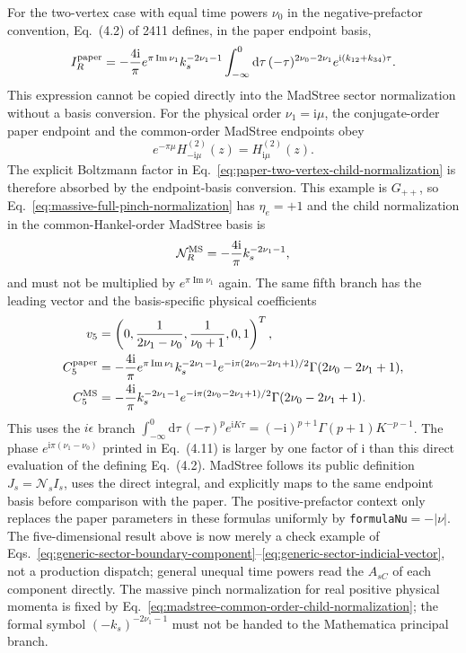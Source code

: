 \documentclass[11pt,a4paper]{article}
\newcommand{\dd}{\mathrm d}
\newcommand{\ii}{\mathrm i}
\newcommand{\cN}{\mathcal N}
\begin{document}
For the two-vertex case with equal time powers $\nu_0$ in the negative-prefactor convention, Eq.~(4.2) of 2411 defines, in the paper endpoint basis,
\begin{equation}
 I_R^{\rm paper}=-\frac{4\ii}{\pi}e^{\pi\operatorname{Im}\nu_1}k_s^{-2\nu_1-1}
 \int_{-\infty}^{0}\dd\tau\,(-\tau)^{2\nu_0-2\nu_1}
 e^{\ii(k_{12}+k_{34})\tau}.
 \label{eq:paper-two-vertex-child-normalization}
\end{equation}
This expression cannot be copied directly into the MadStree sector normalization without a basis conversion. For the physical order $\nu_1=\ii\mu$, the conjugate-order paper endpoint and the common-order MadStree endpoints obey
\begin{equation}
 e^{-\pi\mu}H^{(2)}_{-\ii\mu}(z)=H^{(2)}_{\ii\mu}(z).
 \label{eq:paper-endpoint-to-common-hankel-order}
\end{equation}
The explicit Boltzmann factor in Eq.~\eqref{eq:paper-two-vertex-child-normalization} is therefore absorbed by the endpoint-basis conversion. This example is $G_{++}$, so Eq.~\eqref{eq:massive-full-pinch-normalization} has $\eta_e=+1$ and the child normalization in the common-Hankel-order MadStree basis is
\begin{equation}
 \cN_R^{\rm MS}=-\frac{4\ii}{\pi}k_s^{-2\nu_1-1},
 \label{eq:madstree-common-order-child-normalization}
\end{equation}
and must not be multiplied by $e^{\pi\operatorname{Im}\nu_1}$ again. The same fifth branch has the leading vector and the basis-specific physical coefficients
\begin{align}
 v_5&=\left(0,\frac{1}{2\nu_1-\nu_0},\frac{1}{\nu_0+1},0,1\right)^T,
 \notag\\
 C_5^{\rm paper}&=-\frac{4\ii}{\pi}e^{\pi\operatorname{Im}\nu_1}
 k_s^{-2\nu_1-1}e^{-\ii\pi(2\nu_0-2\nu_1+1)/2}
 \Gamma(2\nu_0-2\nu_1+1),
 \notag\\
 C_5^{\rm MS}&=-\frac{4\ii}{\pi}
 k_s^{-2\nu_1-1}e^{-\ii\pi(2\nu_0-2\nu_1+1)/2}
 \Gamma(2\nu_0-2\nu_1+1).
 \label{eq:paper-two-vertex-contact-boundary}
\end{align}
This uses the $i\epsilon$ branch $\int_{-\infty}^{0}\dd\tau\,(-\tau)^p e^{\ii K\tau}=(-\ii)^{p+1}\Gamma(p+1)K^{-p-1}$. The phase $e^{\ii\pi(\nu_1-\nu_0)}$ printed in Eq.~(4.11) is larger by one factor of $\ii$ than this direct evaluation of the defining Eq.~(4.2). MadStree follows its public definition $J_s=\cN_s I_s$, uses the direct integral, and explicitly maps to the same endpoint basis before comparison with the paper. The positive-prefactor context only replaces the paper parameters in these formulas uniformly by \texttt{formulaNu}$=-|\nu|$. The five-dimensional result above is now merely a check example of Eqs.~\eqref{eq:generic-sector-boundary-component}--\eqref{eq:generic-sector-indicial-vector}, not a production dispatch; general unequal time powers read the $A_{sC}$ of each component directly. The massive pinch normalization for real positive physical momenta is fixed by Eq.~\eqref{eq:madstree-common-order-child-normalization}; the formal symbol $(-k_s)^{-2\nu_1-1}$ must not be handed to the Mathematica principal branch.
\end{document}
